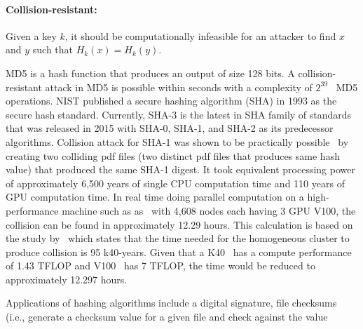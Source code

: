 \paragraph{Collision-resistant:} Given a key $k$, it should be computationally
infeasible for an attacker to find $x$ and $y$ such that $H_k(x) = H_k(y)$.
\par   
MD5 is a hash function that produces an output of size 128 bits. A
collision-resistant attack in MD5 is possible within seconds with a complexity
of $2^{39}$~\cite{wang2005break} MD5 operations. NIST published a secure
hashing algorithm (SHA) in 1993 as the secure hash standard. Currently, SHA-3
is the latest in SHA family of standards that was released in 2015 with SHA-0,
SHA-1, and SHA-2 as its predecessor algorithms. Collision attack for SHA-1 was
shown to be practically possible~\cite{stevens2017first} by creating two
colliding pdf files (two distinct pdf files that produces same hash value) that
produced the same SHA-1 digest. It took equivalent processing power of
approximately 6,500 years of single CPU computation time and 110 years of GPU
computation time. In real time doing parallel computation on a high-performance
machine such as as~\cite{oakridge,top500} with 4,608 nodes each having 3 GPU
V100, the collision can be found in approximately 12.29 hours. This calculation
is based on the study by~\cite{stevens2017first} which states that the time
needed for the homogeneous cluster to produce collision is 95 k40-years. Given
that a K40~\cite{k40} has a compute performance of 1.43 TFLOP and
V100~\cite{v100} has 7 TFLOP, the time would be reduced to approximately 12.297
hours.\par
Applications of hashing algorithms include a digital signature, file checksums
(i.e., generate a checksum value for a given file and check against the value

